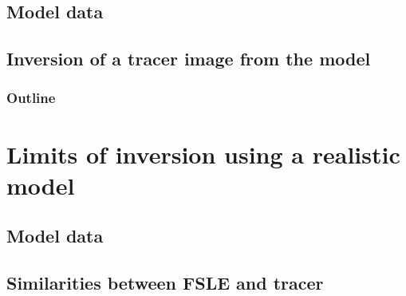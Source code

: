 \documentclass[compress,slidescentered,notes=show]{beamer}
\begin{document}
	\subsection{Model data}
\begin{frame}
\end{frame}

	\subsection{Inversion of a tracer image from the model}
\begin{frame}
\end{frame} 

\begin{frame}
  \frametitle{Outline}
  \tableofcontents%
\end{frame}

\section[Realistic Model data]{Limits of inversion using a realistic model}

	\subsection{Model data}
\begin{frame}
\end{frame}

	\subsection{Similarities between FSLE and tracer}
\begin{frame}
\end{frame}
\end{document}
